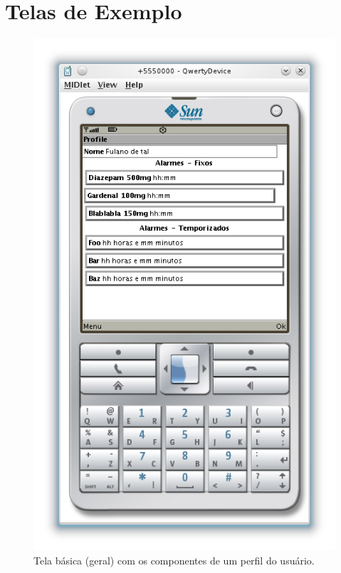 \documentclass[12pt,a4paper]{article}
\begin{document}
\section{Telas de Exemplo}
	\begin{figure}[htb]
		\begin{center}
			\leavevmode
			\includegraphics[scale=1]{medalert-profile.png}
		\end{center}
		\caption{Tela básica (geral) com os componentes de um perfil do usuário.}
		\label{fig:medalert-profile}
	\end{figure}
	
\end{document}
